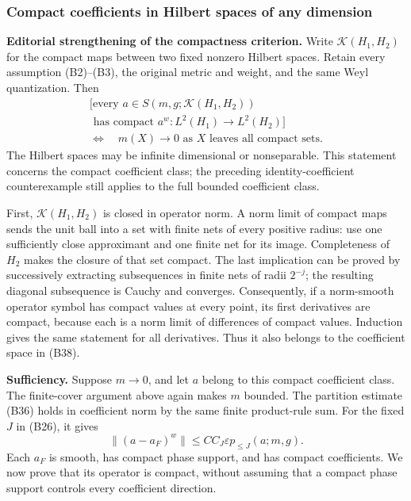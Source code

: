 \documentclass[
  11pt,
]{article}
\begin{document}
\subsubsection{Compact coefficients in Hilbert spaces of any
dimension}\label{compact-coefficients-in-hilbert-spaces-of-any-dimension}

\textbf{Editorial strengthening of the compactness criterion.} Write
\(\mathcal K(H_1,H_2)\) for the compact maps between two fixed nonzero
Hilbert spaces. Retain every assumption (B2)--(B3), the original metric
and weight, and the same Weyl quantization. Then \[
 \begin{gathered}
 \bigl[\text{every }a\in S(m,g;\mathcal K(H_1,H_2))
       \\ \text{ has compact }a^w:L^2(H_1)\to L^2(H_2)\bigr]
 \\ \Longleftrightarrow\quad m(X)\longrightarrow0
 \text{ as }X\text{ leaves all compact sets}.
 \end{gathered}
 \tag{B38}
\] The Hilbert spaces may be infinite dimensional or nonseparable. This
statement concerns the compact coefficient class; the preceding
identity-coefficient counterexample still applies to the full bounded
coefficient class.

First, \(\mathcal K(H_1,H_2)\) is closed in operator norm. A norm limit
of compact maps sends the unit ball into a set with finite nets of every
positive radius: use one sufficiently close approximant and one finite
net for its image. Completeness of \(H_2\) makes the closure of that set
compact. The last implication can be proved by successively extracting
subsequences in finite nets of radii \(2^{-j}\); the resulting diagonal
subsequence is Cauchy and converges. Consequently, if a norm-smooth
operator symbol has compact values at every point, its first derivatives
are compact, because each is a norm limit of differences of compact
values. Induction gives the same statement for all derivatives. Thus it
also belongs to the coefficient space in (B38).

\textbf{Sufficiency.} Suppose \(m\to0\), and let \(a\) belong to this
compact coefficient class. The finite-cover argument above again makes
\(m\) bounded. The partition estimate (B36) holds in coefficient norm by
the same finite product-rule sum. For the fixed \(J\) in (B26), it gives
\[
 \|(a-a_F)^w\|\le C C_J\varepsilon
                         p_{\le J}(a;m,g).
 \tag{B39}
\] Each \(a_F\) is smooth, has compact phase support, and has compact
coefficients. We now prove that its operator is compact, without
assuming that a compact phase support controls every coefficient
direction.
\end{document}
